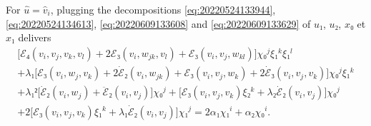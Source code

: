 \documentclass[12pt, final]{scrartcl}
\theoremstyle{definition}
\begin{document}
For \(\hat{u} = \hat{v}_i\), plugging the decompositions
\eqref{eq:20220524133944}, \eqref{eq:20220524134613}, \eqref{eq:20220609133608}
and \eqref{eq:20220609133629} of \(u₁\), \(u₂\), \(x₀ \) et \(x₁\) delivers
\begin{multline*}
  \bigl[ ℰ₄(v_i, v_j,  v_k, v_l) + 2ℰ₃(v_i, w_{jk}, v_l) + ℰ₃(v_i, v_j, w_{kl})\bigr] χ₀^j ξ₁^k ξ₁^l\\
  + λ₁ \bigl[ ℰ₃(v_i,  w_j, v_k) + 2 \dot{ℰ}₂(v_i, w_{jk}) + ℰ₃(v_i, v_j, w_k) + 2 \dot{ℰ}₃(v_i, v_j,  v_k) \bigr] χ₀^j ξ₁^k\\
  + λ₁² \bigl[\dot{ℰ}₂(v_i, w_j) + \ddot{ℰ}₂(v_i, v_j)\bigr] χ₀^j + \bigl[ℰ₃(v_i, v_j, v_k) ξ₂^k + λ₂ \dot{ℰ}₂(v_i, v_j)\bigr] χ₀^j \\
  +2\bigl[ℰ₃(v_i, v_j,  v_k)  ξ₁^k + λ₁ \dot{ℰ}₂(v_i, v_j)\bigr] χ₁^j = 2α₁χ₁^i + α₂ χ₀^i.
\end{multline*}
\end{document}
